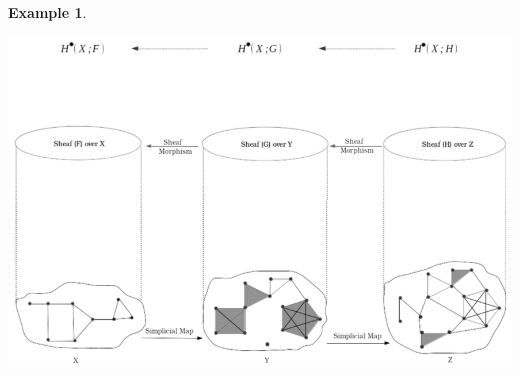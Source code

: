 \documentclass[11pt]{book}
\theoremstyle{definition}
\newtheorem{example}{Example}[section]
\theoremstyle{definition}
\theoremstyle{definition}
\theoremstyle{theorem}
\theoremstyle{definition}
\begin{document}
\begin{example}
\begin{center}
		\includegraphics*[scale =0.37]{SheafCohomBW.png}
	\end{center}  
\end{example}
\end{document}
